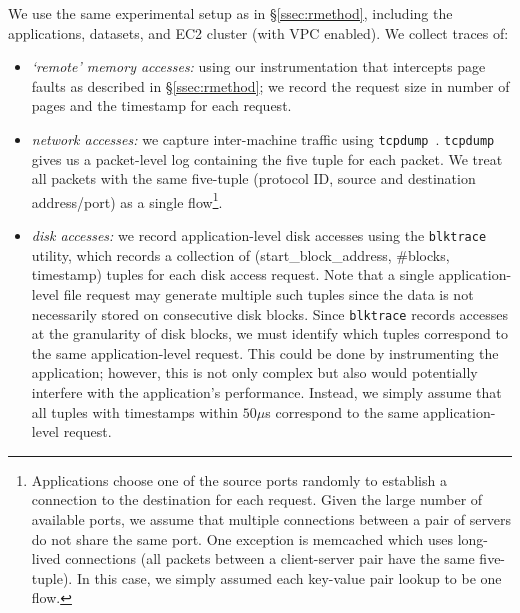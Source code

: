 We use the same experimental setup as in \S\ref{ssec:rmethod}, including the applications, datasets, and EC2 cluster (with VPC enabled). 
We collect traces of: 
\vspace{-0.5em}
\begin{itemize}[leftmargin=*]
\itemsep0em
\item \emph{`remote' memory accesses:} using our instrumentation that intercepts 
page faults as described in \S\ref{ssec:rmethod}; we record the 
request size in number of pages and the timestamp for each request.
\item \emph{network accesses:} we capture inter-machine traffic using {\tt tcpdump}~\cite{tcpdump}. {\tt tcpdump} gives us a packet-level log containing the five tuple for each packet. We treat all packets with the same five-tuple (protocol ID, source and destination address/port) as a single flow{\footnote{Applications choose one of the source ports randomly to establish a connection to the destination for each request. Given the large number of available ports, we assume that multiple connections between a pair of servers do not share the same port.  
One exception is memcached which uses long-lived connections (all packets between a client-server pair have the same five-tuple). In this case, we simply assumed each key-value pair lookup to be one flow.}}.
\item \emph{disk accesses:} we record application-level disk accesses using the {\tt blktrace} utility, which records a collection of (start\_block\_address, \#blocks, timestamp) tuples for each disk access request. Note that a single application-level file request may generate multiple such tuples since the data is not necessarily stored on consecutive disk blocks. Since {\tt blktrace} records accesses at the granularity of disk blocks, we must identify which tuples correspond to the same application-level request. This could be done by instrumenting the application; however, this is not only complex but also would potentially interfere with the application's performance. Instead, we simply assume that all tuples with timestamps within $50\mu$s correspond to the same application-level request. 
\end{itemize} 

